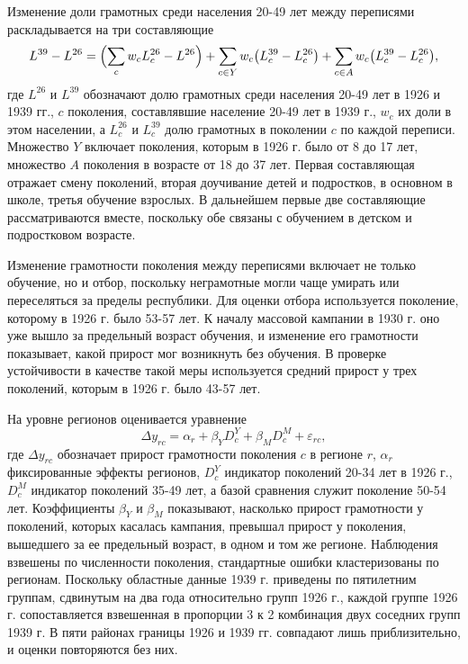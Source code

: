\documentclass[12pt]{article}
\begin{document}
Изменение доли грамотных среди населения 20-49 лет между переписями раскладывается на три составляющие
\begin{equation}\label{eq:dec}
L^{39}-L^{26}=\Bigl(\sum_{c}w_cL^{26}_c-L^{26}\Bigr)+\sum_{c\in Y}w_c\bigl(L^{39}_c-L^{26}_c\bigr)+\sum_{c\in A}w_c\bigl(L^{39}_c-L^{26}_c\bigr),
\end{equation}
где $L^{26}$ и $L^{39}$ обозначают долю грамотных среди населения 20-49 лет в 1926 и 1939 гг., $c$ поколения, составлявшие население 20-49 лет в 1939 г., $w_c$ их доли в этом населении, а $L^{26}_c$ и $L^{39}_c$ долю грамотных в поколении $c$ по каждой переписи. Множество $Y$ включает поколения, которым в 1926 г. было от 8 до 17 лет, множество $A$ поколения в возрасте от 18 до 37 лет. Первая составляющая отражает смену поколений, вторая доучивание детей и подростков, в основном в школе, третья обучение взрослых. В дальнейшем первые две составляющие рассматриваются вместе, поскольку обе связаны с обучением в детском и подростковом возрасте.

Изменение грамотности поколения между переписями включает не только обучение, но и отбор, поскольку неграмотные могли чаще умирать или переселяться за пределы республики. Для оценки отбора используется поколение, которому в 1926 г. было 53-57 лет. К началу массовой кампании в 1930 г. оно уже вышло за предельный возраст обучения, и изменение его грамотности показывает, какой прирост мог возникнуть без обучения. В проверке устойчивости в качестве такой меры используется средний прирост у трех поколений, которым в 1926 г. было 43-57 лет.

На уровне регионов оценивается уравнение
\begin{equation}\label{eq:did}
\Delta y_{rc}=\alpha_r+\beta_YD^Y_c+\beta_MD^M_c+\varepsilon_{rc},
\end{equation}
где $\Delta y_{rc}$ обозначает прирост грамотности поколения $c$ в регионе $r$, $\alpha_r$ фиксированные эффекты регионов, $D^Y_c$ индикатор поколений 20-34 лет в 1926 г., $D^M_c$ индикатор поколений 35-49 лет, а базой сравнения служит поколение 50-54 лет. Коэффициенты $\beta_Y$ и $\beta_M$ показывают, насколько прирост грамотности у поколений, которых касалась кампания, превышал прирост у поколения, вышедшего за ее предельный возраст, в одном и том же регионе. Наблюдения взвешены по численности поколения, стандартные ошибки кластеризованы по регионам. Поскольку областные данные 1939 г. приведены по пятилетним группам, сдвинутым на два года относительно групп 1926 г., каждой группе 1926 г. сопоставляется взвешенная в пропорции 3 к 2 комбинация двух соседних групп 1939 г. В пяти районах границы 1926 и 1939 гг. совпадают лишь приблизительно, и оценки повторяются без них.
\end{document}
